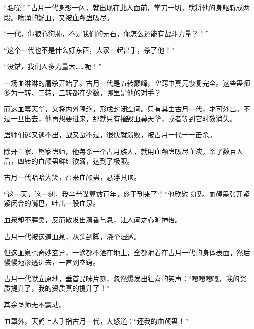 \begin{this_body}
“聒噪！”古月一代身影一闪，就出现在此人面前，掌刀一切，就将他的身躯斩成两段。喷涌的鲜血，又被血颅蛊吸尽。

“一代，你狼心狗肺，不是我们的元石，你怎么还能有战斗力量？！”

“这个一代也不是什么好东西，大家一起出手，杀了他！”

“没错，我们人多力量大……呃！”

一场血淋淋的屠杀开始了。古月一代是五转巅峰，空窍中真元恢复完全。这些蛊师多为一转、二转，三转都在少数，哪里是他的对手？

而这血幕天华，又将内外隔绝，形成封闭空间。只有其主古月一代，才可外出。不过一旦出去，他再想要进来，那就只有摧毁血幕天华，或者等到它时效消失。

蛊师们逃又逃不出，战又战不过，很快就溃败，被古月一代一一击杀。

除开白家、熊家蛊师，他每杀一个古月族人，就用血颅蛊吸尽血液。杀了数百人后，四转的血颅蛊鲜红欲滴，达到了极限。

古月一代哈哈大笑，召来血颅蛊，悬浮其顶。

“这一天，这一刻，我辛苦谋算数百年，终于到来了！”他欣慰长叹。血颅蛊张开紧紧闭合的嘴巴，吐出一股血泉。

血泉却不腥臭，反而散发出清香气息，让人闻之心旷神怡。

古月一代被这道血泉，从头到脚，浇个湿透。

但这血泉也奇妙玄异，一滴都不洒在地上，全都附着在古月一代的身体表面，然后慢慢地渗透进去，一直到空窍。

古月一代默立原地，垂首品味片刻，忽然爆发出狂喜的笑声：“嘎嘎嘎嘎，我的资质提升了，我的资质真的提升了！”

其余蛊师无不震动。

血罩外，天鹤上人手指古月一代，大怒道：“还我的血颅蛊！”

\end{this_body}

